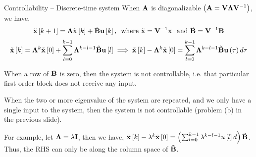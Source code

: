 \documentclass[aspectratio=169]{beamer}
\def\mf{\ensuremath\mathbf}
\def\lp{\ensuremath\left(}
\def\rp{\ensuremath\right)}
\def\ls{\ensuremath\left[}
\def\rs{\ensuremath\right]}
\newcommand{\ct}[1]{\lp #1\rp}
\newcommand{\dt}[1]{\ls #1\rs}
\begin{document}
\begin{frame}{Controllability -- Discrete-time system}
When $\mf{A}$ is diagonalizable $\ct{\mf{A} = \mf{V}\mf{\Lambda}\mf{V}^{-1}}$, we have,
\[ \tilde{\mf{x}}\dt{k+1} = \mf{\Lambda}\tilde{\mf{x}}\dt{k} + \tilde{\mf{B}}\mf{u}\dt{k}, \,\,\,\text{where } \tilde{\mf{x}} = \mf{V}^{-1}\mf{x} \,\, \text{ and } \tilde{\mf{B}} = \mf{V}^{-1}\mf{B} \]
\[ \tilde{\mf{x}}\dt{k} = \mf{\Lambda}^k\tilde{\mf{x}}\dt{0} + \sum_{l=0}^{k-1} \mf{\Lambda}^{k - l - 1}\tilde{\mf{B}}\mf{u}\dt{l} \implies \tilde{\mf{x}}\dt{k} - \mf{\Lambda}^{k}\tilde{\mf{x}}\dt{0} =  \sum_{l=0}^{k-1}\mf{\Lambda}^{k-l-1}\tilde{\mf{B}}\mf{u}\ct{\tau}d\tau \]

When a row of $\tilde{\mf{B}}$ is zero, then the system is not controllable, i.e. that particular first order block does not receive any input.\vspace{0.2cm}

When the two or more eigenvalue of the system are repeated, and we only have a single input to the system, then the system is not controllable (problem (b) in the previous slide).

For example, let $\mf{\Lambda} = \lambda \mf{I}$, then we have, $\tilde{\mf{x}}\dt{k} - \lambda^k\tilde{\mf{x}}\dt{0} =  \ct{\sum_{l=0}^{k-1} \lambda^{k-l-1}u\dt{l}d}\tilde{\mf{B}}$. Thus, the RHS can only be along the column space of $\tilde{\mf{B}}$.
\end{frame}
\end{document}
